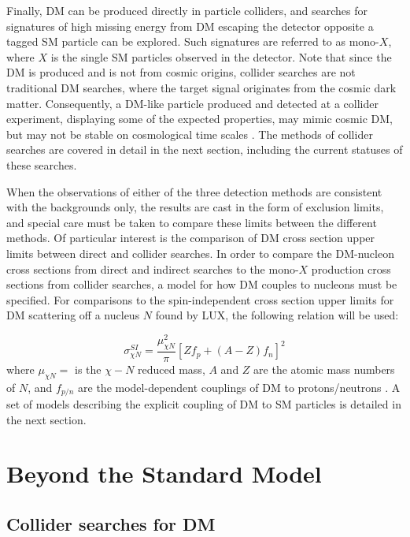 \indent Finally, DM can be produced directly in particle colliders, and searches for signatures of high missing energy from DM escaping the detector opposite a tagged SM particle can be explored. Such signatures are referred to as mono-$X$, where $X$ is the single SM particles observed in the detector. Note that since the DM is produced and is not from cosmic origins, collider searches are not traditional DM searches, where the target signal originates from the cosmic dark matter. Consequently, a DM-like particle produced and detected at a collider experiment, displaying some of the expected properties, may mimic cosmic DM, but may not be stable on cosmological time scales \cite{Askew:2014kqa}. The methods of collider searches are covered in detail in the next section, including the current statuses of these searches. 

\indent When the observations of either of the three detection methods are consistent with the backgrounds only, the results are cast in the form of exclusion limits, and special care must be taken to compare these limits between the different methods. Of particular interest is the comparison of DM cross section upper limits between direct and collider searches. In order to compare the DM-nucleon cross sections from direct and indirect searches to the mono-$X$ production cross sections from collider searches, a model for how DM couples to nucleons must be specified. For comparisons to the spin-independent cross section upper limits for DM scattering off a nucleus $N$ found by LUX, the following relation will be used:

\begin{equation}
\sigma^{SI}_{\chi N} = \frac{\mu^2_{\chi N}}{\pi} [Zf_p + (A-Z)f_n]^2
\end{equation}
where $\mu_{\chi N} = $ is the $\chi-N$ reduced mass, $A$ and $Z$ are the atomic mass numbers of $N$, and $f_{p/n}$ are the model-dependent couplings of DM to protons/neutrons \cite{Carpenter:2013xra}. A set of models describing the explicit coupling of DM to SM particles is detailed in the next section.

\section{Beyond the Standard Model}

\subsection{Collider searches for DM}

